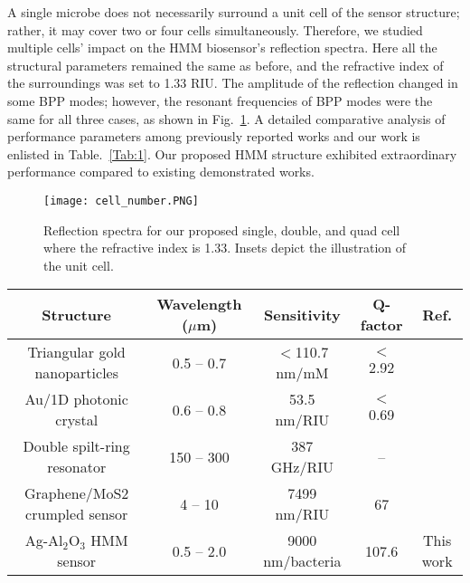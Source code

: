 \documentclass[conference]{IEEEtran}
\begin{document}
A single microbe does not necessarily surround a unit cell of the sensor structure; rather, it may cover two or four cells simultaneously. Therefore, we studied multiple cells' impact on the HMM biosensor's reflection spectra. Here all the structural parameters remained the same as before, and the refractive index of the surroundings was set to 1.33 RIU. The amplitude of the reflection changed in some BPP modes; however, the resonant frequencies of BPP modes were the same for all three cases, as shown in Fig.~\ref{cell number}. A detailed comparative analysis of performance parameters among previously reported works and our work is enlisted in Table.~\ref{Tab:1}. Our proposed HMM structure exhibited extraordinary performance compared to existing demonstrated works. 
\begin{figure}[ht]
\centering
\texttt{[image: cell\_number.PNG]}
\caption{Reflection spectra for our proposed single, double, and quad cell where the refractive index is 1.33. Insets depict the illustration of the unit cell.}
\label{cell number}
\end{figure}
\begin{table*}[htbp]
\caption{Comparative performance analysis of biosensors}
\begin{center}

\begin{tabular}{c c c c c}
\hline
Structure & Wavelength ($\mu$m) & Sensitivity &  Q-factor & Ref. \\
\hline
Triangular gold nanoparticles & 0.5 -- 0.7 & $<$110.7 nm/mM & $<$ 2.92 & \cite{Chowdhury} \\

Au/1D photonic crystal & 0.6 -- 0.8 & 53.5 nm/RIU & $<$ 0.69 & \cite{Ahmed} \\

Double spilt-ring resonator & 150 -- 300 & 387 GHz/RIU & -- & \cite{Nine} \\ 

Graphene/MoS2 crumpled sensor & 4 -- 10 & 7499 nm/RIU & 67 & \cite{vahid} \\

Ag-Al$_2$O$_3$ HMM sensor & 0.5 -- 2.0 & 9000 nm/bacteria & 107.6 & This work \\
\hline
\end{tabular}
\label{Tab:1}
\end{center}
\end{table*}
\end{document}
